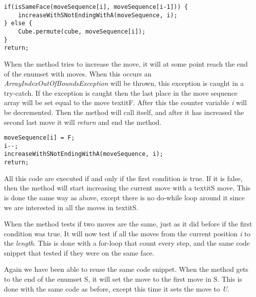 \begin{verbatim}
if(isSameFace(moveSequence[i], moveSequence[i-1])) {
	increaseWithSNotEndingWithA(moveSequence, i);
} else {
	Cube.permute(cube, moveSequence[i]);
}
return;
\end{verbatim}

When the method tries to increase the move, it will at some point reach the end of the enumset with moves.
When this occurs an \textit{ArrayIndexOutOfBoundsException} will be thrown, this exception is caught in a try-catch.
If the exception is caught then the last place in the move sequence array will be set equal to the move textit{F}.
After this the counter variable \textit{i} will be decremented.
Then the method will call itself, and after it has increased the second last move it will \textit{return} and end the method.

\begin{verbatim}
moveSequence[i] = F;
i--;
increaseWithSNotEndingWithA(moveSequence, i);
return;
\end{verbatim}

All this code are executed if and only if the first condition is true.
If it is false, then the method will start increasing the current move with a textit{S} move.
This is done the same way as above, except there is no do-while loop around it since we are interested in all the moves in textit{S}.

When the method tests if two moves are the same, just as it did before if the first condition was true.
It will now test if all the moves from the current position \textit{i} to the \textit{length}.
This is done with a for-loop that count every step, and the same code snippet that tested if they were on the same face.

Again we have been able to reuse the same code snippet.
When the method gets to the end of the enumset S, it will set the move to the first move in S.
This is done with the same code as before, except this time it sets the move to \textit{U}.